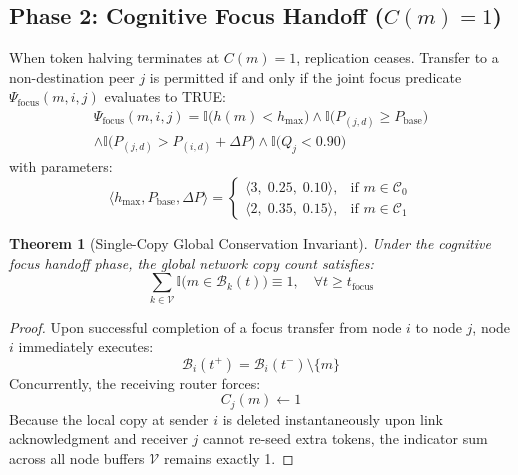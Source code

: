 \documentclass[journal,compsoc]{IEEEtran}
\newtheorem{theorem}{Theorem}
\begin{document}
\subsection{Phase 2: Cognitive Focus Handoff ($C(m) = 1$)}
When token halving terminates at $C(m) = 1$, replication ceases. Transfer to a non-destination peer $j$ is permitted if and only if the joint focus predicate $\Psi_{\mathrm{focus}}(m, i, j)$ evaluates to TRUE:
\begin{multline}
\Psi_{\mathrm{focus}}(m, i, j) = \mathbb{I}\bigl(h(m) < h_{\max}\bigr) \land \mathbb{I}\bigl(P_{(j, d)} \ge P_{\mathrm{base}}\bigr) \\
\land \mathbb{I}\bigl(P_{(j, d)} > P_{(i, d)} + \Delta P\bigr) \land \mathbb{I}\bigl(Q_j < 0.90\bigr)
\end{multline}
with parameters:
\begin{equation}
\langle h_{\max}, P_{\mathrm{base}}, \Delta P \rangle = \begin{cases}
\langle 3, \; 0.25, \; 0.10 \rangle, & \text{if } m \in \mathcal{C}_0 \\
\langle 2, \; 0.35, \; 0.15 \rangle, & \text{if } m \in \mathcal{C}_1
\end{cases}
\end{equation}

\begin{theorem}[Single-Copy Global Conservation Invariant]
\label{thm:single_copy}
Under the cognitive focus handoff phase, the global network copy count satisfies:
\begin{equation}
\sum_{k \in \mathcal{V}} \mathbb{I}\bigl(m \in \mathcal{B}_k(t)\bigr) \equiv 1, \quad \forall t \ge t_{\mathrm{focus}}
\end{equation}
\end{theorem}

\begin{proof}
Upon successful completion of a focus transfer from node $i$ to node $j$, node $i$ immediately executes:
\begin{equation*}
\mathcal{B}_i(t^+) = \mathcal{B}_i(t^-) \setminus \{m\}
\end{equation*}
Concurrently, the receiving router forces:
\begin{equation*}
C_j(m) \leftarrow 1
\end{equation*}
Because the local copy at sender $i$ is deleted instantaneously upon link acknowledgment and receiver $j$ cannot re-seed extra tokens, the indicator sum across all node buffers $\mathcal{V}$ remains exactly 1.
\end{proof}
\end{document}
